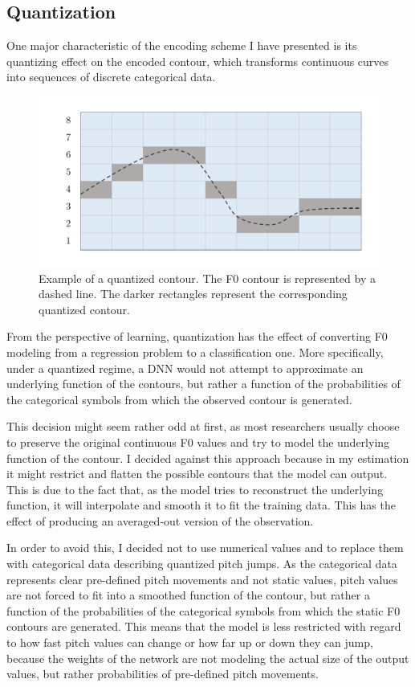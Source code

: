 \subsection{Quantization}

One major characteristic of the encoding scheme I have presented is its quantizing effect on the encoded contour, which transforms continuous curves into sequences of discrete categorical data.

\begin{figure}[H]
    \centering
    \includegraphics[scale=0.4]{figures/quantization.pdf}
    \caption[Example of a quantized contour]{Example of a quantized contour. The \ac{F0} contour is represented by a dashed line. The darker rectangles represent the corresponding quantized contour.}
    \label{fig:quantization}
\end{figure}

From the perspective of learning, quantization has the effect of converting \ac{F0} modeling from a regression problem to a classification one.
More specifically, under a quantized regime, a \ac{DNN} would not attempt to approximate an underlying function of the contours, but rather a function of the probabilities of the categorical symbols from which the observed contour is generated.

This decision might seem rather odd at first, as most researchers usually choose to preserve the original continuous \ac{F0} values and try to model the underlying function of the contour.
I decided against this approach because in my estimation it might restrict and flatten the possible contours that the model can output.
This is due to the fact that, as the model tries to reconstruct the underlying function, it will interpolate and smooth it to fit the training data.
This has the effect of producing an averaged-out version of the observation.

In order to avoid this, I decided not to use numerical values and to replace them with categorical data describing quantized pitch jumps.
As the categorical data represents clear pre-defined pitch movements and not static values, pitch values are not forced to fit into a smoothed function of the contour, but rather a function of the probabilities of the categorical symbols from which the static \ac{F0} contours are generated.
This means that the model is less restricted with regard to how fast pitch values can change or how far up or down they can jump, because the weights of the network are not modeling the actual size of the output values, but rather probabilities of pre-defined pitch movements.

